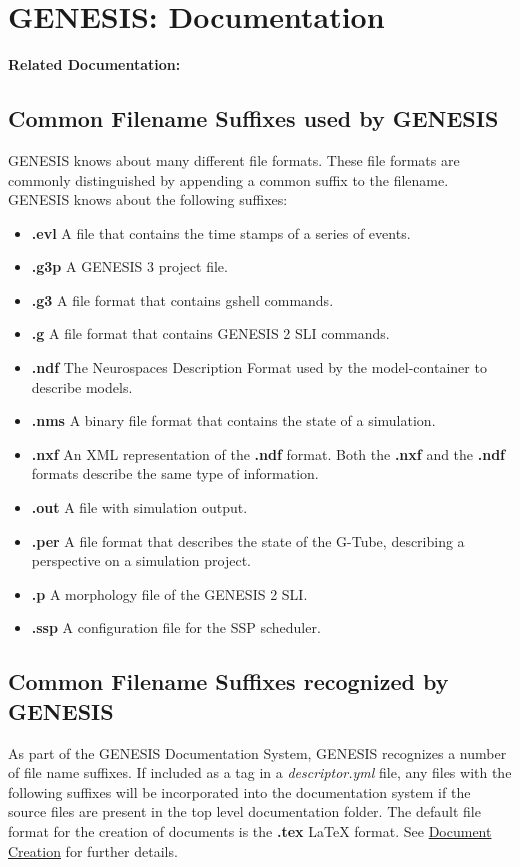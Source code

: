 \documentclass[12pt]{article}
\begin{document}
\section*{GENESIS: Documentation}

{\bf Related Documentation:}

\subsection*{Common Filename Suffixes used by GENESIS}

GENESIS knows about many different file formats.  These file formats
are commonly distinguished by appending a common suffix to the
filename.  GENESIS knows about the following suffixes:

\begin{itemize}

\item[]{\bf .evl} A file that contains the time stamps of a series of events.
\item[]{\bf .g3p} A GENESIS 3 project file.
\item[]{\bf .g3} A file format that contains gshell commands.
\item[]{\bf .g} A file format that contains GENESIS 2 SLI commands.
\item[]{\bf .ndf} The Neurospaces Description Format used by the model-container to describe models.
\item[]{\bf .nms} A binary file format that contains the state of a simulation.
\item[]{\bf .nxf} An XML representation of the {\bf .ndf} format.  Both the {\bf .nxf} and the {\bf .ndf} formats describe the same type of information.
\item[]{\bf .out} A file with simulation output.
\item[]{\bf .per} A file format that describes the state of the G-Tube, describing a perspective on a simulation project.
\item[]{\bf .p} A morphology file of the GENESIS 2 SLI.
\item[]{\bf .ssp} A configuration file for the SSP scheduler.

\end{itemize}

\subsection*{Common Filename Suffixes recognized by GENESIS}
As part of the GENESIS Documentation System, GENESIS recognizes a number of file name suffixes. If included as a tag in a {\it descriptor.yml} file, any files with the following suffixes will be incorporated into the documentation system if the source files are present in the top level documentation folder. The default file format for the creation of documents is the {\bf .tex} \LaTeX\,\,format. See \href{../document-create/document-create.tex}{Document Creation} for further details.
\end{document}
